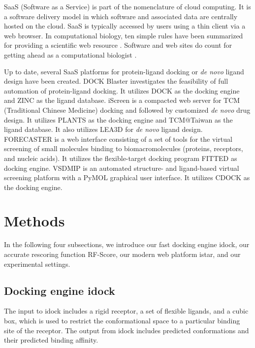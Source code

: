 SaaS (Software as a Service) is part of the nomenclature of cloud computing. It is a software delivery model in which software and associated data are centrally hosted on the cloud. SaaS is typically accessed by users using a thin client via a web browser. In computational biology, ten simple rules have been summarized for providing a scientific web resource \citep{677}. Software and web sites do count for getting ahead as a computational biologist \citep{260}.

Up to date, several SaaS platforms for protein-ligand docking or \textit{de novo} ligand design have been created. DOCK Blaster \citep{557} investigates the feasibility of full automation of protein-ligand docking. It utilizes DOCK \citep{1222} as the docking engine and ZINC \citep{532,1178} as the ligand database. iScreen \citep{899} is a compacted web server for TCM (Traditional Chinese Medicine) docking and followed by customized \textit{de novo} drug design. It utilizes PLANTS \citep{610,607,779} as the docking engine and TCM@Taiwan \citep{528} as the ligand database. It also utilizes LEA3D \citep{1223} for \textit{de novo} ligand design. FORECASTER \citep{1012} is a web interface consisting of a set of tools for the virtual screening of small molecules binding to biomacromolecules (proteins, receptors, and nucleic acids). It utilizes the flexible-target docking program FITTED \citep{602} as docking engine. VSDMIP \citep{848} is an automated structure- and ligand-based virtual screening platform with a PyMOL graphical user interface. It utilizes CDOCK \citep{1224} as the docking engine.

\section{Methods}

In the following four subsections, we introduce our fast docking engine idock, our accurate rescoring function RF-Score, our modern web platform istar, and our experimental settings.

\subsection{Docking engine idock}

The input to idock includes a rigid receptor, a set of flexible ligands, and a cubic box, which is used to restrict the conformational space to a particular binding site of the receptor. The output from idock includes predicted conformations and their predicted binding affinity.

